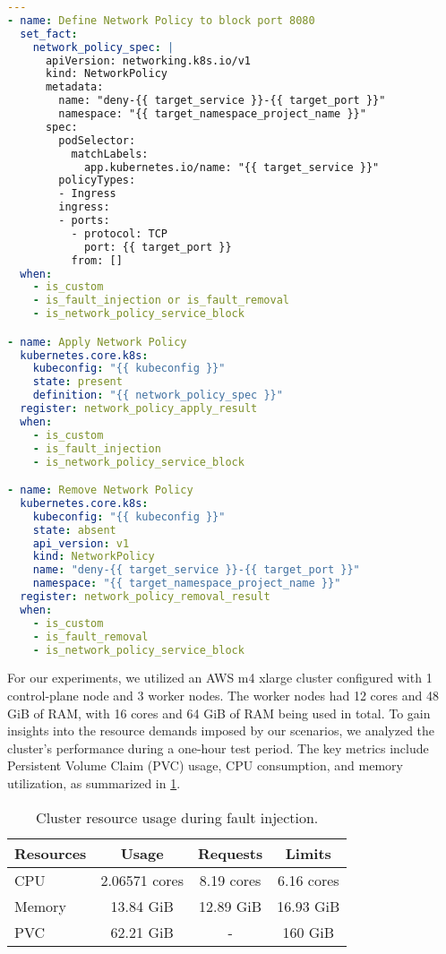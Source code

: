 \begin{lstlisting}[language=YAML]
---
- name: Define Network Policy to block port 8080
  set_fact:
    network_policy_spec: |
      apiVersion: networking.k8s.io/v1
      kind: NetworkPolicy
      metadata:
        name: "deny-{{ target_service }}-{{ target_port }}" 
        namespace: "{{ target_namespace_project_name }}"
      spec:
        podSelector:
          matchLabels:
            app.kubernetes.io/name: "{{ target_service }}"
        policyTypes:
        - Ingress
        ingress:
        - ports:
          - protocol: TCP
            port: {{ target_port }}
          from: []
  when:
    - is_custom
    - is_fault_injection or is_fault_removal
    - is_network_policy_service_block

- name: Apply Network Policy
  kubernetes.core.k8s:
    kubeconfig: "{{ kubeconfig }}"
    state: present
    definition: "{{ network_policy_spec }}"
  register: network_policy_apply_result
  when:
    - is_custom
    - is_fault_injection
    - is_network_policy_service_block

- name: Remove Network Policy
  kubernetes.core.k8s:
    kubeconfig: "{{ kubeconfig }}"
    state: absent
    api_version: v1
    kind: NetworkPolicy
    name: "deny-{{ target_service }}-{{ target_port }}" 
    namespace: "{{ target_namespace_project_name }}"
  register: network_policy_removal_result
  when:
    - is_custom
    - is_fault_removal
    - is_network_policy_service_block
\end{lstlisting}

For our experiments, we utilized an AWS m4 xlarge cluster configured with 1 control-plane node and 3 worker nodes. The worker nodes had 12 cores and 48 GiB of RAM, with 16 cores and 64 GiB of RAM being used in total. To gain insights into the resource demands imposed by our scenarios, we analyzed the cluster’s performance during a one-hour test period. The key metrics include Persistent Volume Claim (PVC) usage, CPU consumption, and memory utilization, as summarized in \cref{tab:resource-usage}.

\begin{table}[h]
    \centering
    \small
    \begin{threeparttable}
        \caption{Cluster resource usage during fault injection.}
        \begin{tabular}{lccc}
            \toprule
           \textbf{Resources} & \textbf{Usage}  & \textbf{Requests}  & \textbf{Limits} \\ 
 \midrule
CPU       & 2.06571 cores         & 8.19 cores        & 6.16 cores      \\ \hline
Memory    & 13.84 GiB             & 12.89 GiB         & 16.93 GiB       \\ \hline
PVC       & 62.21 GiB             & -                 & 160 GiB \\
\bottomrule 
\end{tabular}
\label{tab:resource-usage}
\end{threeparttable}
\end{table}



